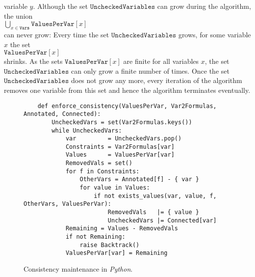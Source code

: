 variable $y$.  Although the set $\texttt{UncheckedVariables}$ can grow during the algorithm,  the union
\\[0.2cm]
\hspace*{1.3cm}
$\bigcup\limits_{x \in \texttt{Vars}} \texttt{ValuesPerVar}[x]$ 
\\[0.2cm]
can never grow:  Every time the set $\texttt{UncheckedVariables}$ grows,
for some variable $x$ the set
\\[0.2cm]
\hspace*{1.3cm}
$\texttt{ValuesPerVar}[x]$ 
\\[0.2cm] 
shrinks.  As the sets $\texttt{ValuesPerVar}[x]$ are finite for all variables $x$, the set
$\texttt{UncheckedVariables}$ can only grow a finite number of times. 
Once the set $\texttt{UncheckedVariables}$ does not grow any more, every iteration of the algorithm removes one
variable from this set and hence the algorithm terminates eventually.

\begin{figure}[!ht]
\centering
\begin{verbatim}
    def enforce_consistency(ValuesPerVar, Var2Formulas, Annotated, Connected):
        UncheckedVars = set(Var2Formulas.keys())
        while UncheckedVars:
            var         = UncheckedVars.pop()
            Constraints = Var2Formulas[var]
            Values      = ValuesPerVar[var]
            RemovedVals = set()
            for f in Constraints:
                OtherVars = Annotated[f] - { var }
                for value in Values:
                    if not exists_values(var, value, f, OtherVars, ValuesPerVar):
                        RemovedVals   |= { value }
                        UncheckedVars |= Connected[var]
            Remaining = Values - RemovedVals
            if not Remaining:
                raise Backtrack()
            ValuesPerVar[var] = Remaining
\end{verbatim}
\vspace*{-0.3cm}
\caption{Consistency maintenance in \textsl{Python}.}
\label{fig:Consistency-Solver.ipynb:enforce_consistency}
\end{figure}


